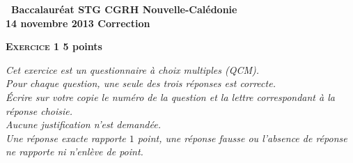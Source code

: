 \documentclass[10pt,a4paper]{article}
\begin{document}
\setlength\parindent{0mm}
\pagestyle{fancy}
\thispagestyle{empty}
\begin{center}{\Large\textbf{\decofourleft~Baccalauréat STG CGRH Nouvelle-Calédonie~\decofourright\\ 14 novembre 2013 \hspace{1em}Correction}} 
\end{center}

\vspace{0,5cm}

\textbf{\textsc{Exercice 1} \hfill 5 points}

\medskip
{\footnotesize
\emph{Cet exercice est un questionnaire à choix multiples (QCM).\\
Pour chaque question, une seule des trois réponses est correcte.\\
Écrire sur votre copie le numéro de la  question et la lettre correspondant à la réponse choisie.\\
Aucune justification n’est demandée.\\
Une réponse exacte rapporte $1$ point,  une réponse  fausse ou l’absence de réponse ne rapporte ni n’enlève de point.}
}
\bigskip
\end{document}
